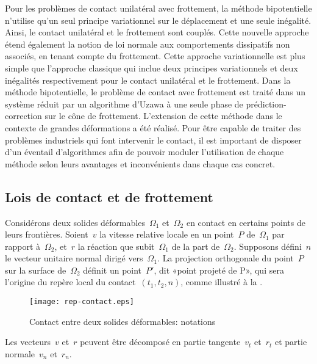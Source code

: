 Pour les problèmes de contact unilatéral avec frottement, la méthode bipotentielle n'utilise qu'un seul principe variationnel sur le déplacement et une seule inégalité. Ainsi, le contact unilatéral et le frottement sont couplés. Cette nouvelle approche étend également la notion de loi normale aux comportements dissipatifs non associés, en tenant compte du frottement. Cette approche variationnelle est plus simple que l'approche classique qui inclue deux principes variationnels et deux inégalités respectivement pour le contact unilatéral et le frottement. Dans la méthode bipotentielle, le problème de contact avec frottement est traité dans un système réduit par un algorithme d'Uzawa à une seule phase de prédiction-correction sur le cône de frottement. L'extension de cette méthode dans le contexte de grandes déformations a été réalisé. Pour être capable de traiter des problèmes industriels qui font intervenir le contact, il est important de disposer d'un éventail d'algorithmes afin de pouvoir moduler l'utilisation de chaque méthode selon leurs avantages et inconvénients dans chaque cas concret.

\medskip
\subsection{Lois de contact et de frottement}

Considérons deux solides déformables~$\Omega_1$ et~$\Omega_2$ en contact en certains points de leurs frontières. Soient~$v$ la vitesse relative locale en un point~$P$ de~$\Omega_1$ par rapport à~$\Omega_2$, et~$r$ la réaction que subit~$\Omega_1$ de la part de~$\Omega_2$.
Supposons défini~$n$ le vecteur unitaire normal dirigé vers~$\Omega_1$.
La projection orthogonale du point~$P$ sur la surface de~$\Omega_2$ définit un point~$P'$, dit «point projeté de P», qui sera l'origine du repère local du contact~$(t_1, t_2, n)$,
comme illustré à la .
\begin{figure}[htb]
\centerline{\texttt{[image: rep-contact.eps]}}
\caption{Contact entre deux solides déformables: notations}\label{Fig-rep-contact}
\end{figure}

Les vecteurs~$v$ et~$r$ peuvent être décomposé en partie tangente~$v_t$ et~$r_t$ et partie normale~$v_n$ et~$r_n$.

